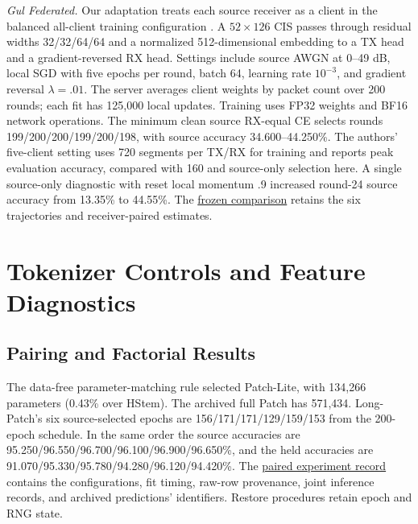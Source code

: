 \documentclass[journal]{IEEEtran}
\begin{document}
\textit{Gul Federated.} Our adaptation treats each source receiver as a client in the balanced all-client training configuration \cite{gul2026federated}. A $52\times126$ CIS passes through residual widths 32/32/64/64 and a normalized 512-dimensional embedding to a TX head and a gradient-reversed RX head. Settings include source AWGN at 0--49 dB, local SGD with five epochs per round, batch 64, learning rate \(10^{-3}\), and gradient reversal \(\lambda=.01\). The server averages client weights by packet count over 200 rounds; each fit has 125,000 local updates. Training uses FP32 weights and BF16 network operations. The minimum clean source RX-equal CE selects rounds 199/200/200/199/200/198, with source accuracy 34.600--44.250\%. The authors' five-client setting uses 720 segments per TX/RX for training and reports peak evaluation accuracy, compared with 160 and source-only selection here. A single source-only diagnostic with reset local momentum .9 increased round-24 source accuracy from 13.35\% to 44.55\%. The \href{https://github.com/hanCChan/crossatten/tree/2fe246263f75/research/s43_gul_federated}{frozen comparison} retains the six trajectories and receiver-paired estimates.

\begin{table}[!t]\centering
\caption{Gul adaptation contrasts on Native, in pp. Intervals are conditional on receivers and fits.}
\label{tab:paired-gul}
\end{table}

\section{Tokenizer Controls and Feature Diagnostics}
\subsection{Pairing and Factorial Results}
The data-free parameter-matching rule selected Patch-Lite, with 134,266 parameters (0.43\% over HStem). The archived full Patch has 571,434. Long-Patch's six source-selected epochs are 156/171/171/129/159/153 from the 200-epoch schedule. In the same order the source accuracies are 95.250/96.550/96.700/96.100/96.900/96.650\%, and the held accuracies are 91.070/95.330/95.780/94.280/96.120/94.420\%. The \href{https://github.com/hanCChan/crossatten/tree/ad5443e/26-long-patch-control}{paired experiment record} contains the configurations, fit timing, raw-row provenance, joint inference records, and archived predictions' identifiers. Restore procedures retain epoch and RNG state.
\end{document}
